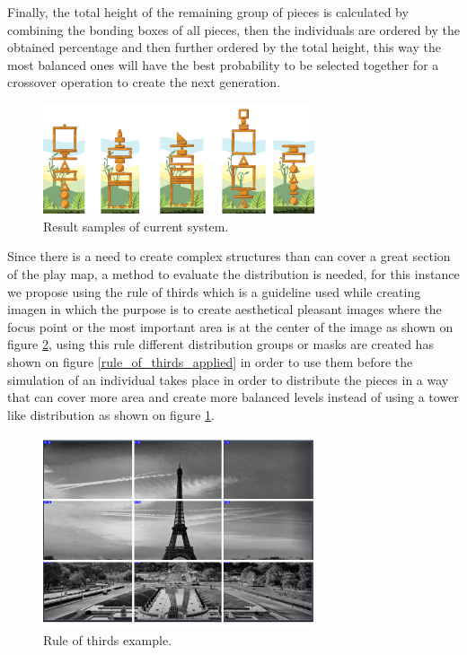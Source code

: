 \documentclass[conference]{IEEEtran}
\begin{document}
Finally, the total height of the remaining group of pieces is calculated by
combining the bonding boxes of all pieces, then the individuals are ordered by
the obtained percentage and then further ordered by the total height, this way
the most balanced ones will have the best probability to be selected together
for a crossover operation to create the next generation.

\begin{figure}[htbp]
\centerline{\includegraphics[width=80mm]{Images/result_example.png}}
\caption{Result samples of current system.}
\label{results_old}
\end{figure}

Since there is a need to create complex structures than can cover a great
section of the play map, a method to evaluate the distribution is needed, for
this instance we propose using the rule of thirds \cite{DarrenRowse} which is a
guideline used while creating imagen in which the purpose is to create
aesthetical pleasant images where the focus point or the most important area is
at the center of the image as shown on figure \ref{rule_of_thirds}, using this
rule different distribution groups or masks are created has shown on figure
\ref{rule_of_thirds_applied} in order to use them before the simulation of an
individual takes place in order to distribute the pieces in a way that can cover
more area and create more balanced levels instead of using a tower like
distribution as shown on figure \ref{results_old}.

\begin{figure}[htbp]
    \centerline{\includegraphics[width=80mm]{Images/ruleofthirds_example.png}}
    \caption{Rule of thirds example.}
    \label{rule_of_thirds}
\end{figure}
\end{document}

